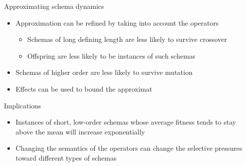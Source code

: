 \documentclass[%
pdf,
colorBG,
slideColor,
tcrico,
]{prosper}
\begin{document}
\begin{slide}{ Approximating schema dynamics }  
\begin{itemize}
 \item Approximation can be refined by taking into account the operators
\begin{itemize}
\item Schemas of long defining length are less likely to survive crossover
\item Offspring are less likely to be instances of such schemas
\end{itemize}
\item Schemas of higher order are less likely to survive mutation
\item Effects can be used to bound the approximat

\end{itemize}

\end{slide}



\begin{slide}{ Implications }  
\begin{itemize}
 \item Instances of short, low-order schemas whose average fitness tends to stay above the mean will increase exponentially
\item Changing the semantics of the operators can change the selective pressures toward different types of schemas
\end{itemize}

\end{slide}
\end{document}
